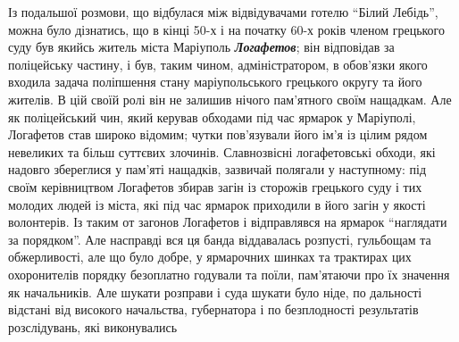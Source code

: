 \documentclass[a4paper,20pt]{report}
\begin{document}
Із подальшої розмови, що відбулася між відвідувачами готелю ``Білий Лебідь'', можна було
дізнатись, що в кінці 50-х і на початку 60-х років членом грецького суду був якийсь
житель міста Маріуполь \textbf{\em Логафетов}; він відповідав за поліцейську частину, і був,
таким чином, адміністратором, в обов'язки якого входила задача поліпшення стану маріупольського
грецького округу та його жителів.
В цій своїй ролі він не залишив нічого пам'ятного своїм нащадкам. Але як поліцейський чин,
який керував обходами під час ярмарок у Маріуполі, Логафетов став широко відомим; 
чутки пов'язували його ім'я із цілим рядом невеликих та більш суттєвих злочинів.
Славнозвісні логафетовські обходи, які надовго збереглися у пам'яті нащадків, зазвичай полягали
у наступному: під своїм керівництвом Логафетов збирав загін із сторожів грецького суду і тих молодих
людей із міста, які під час ярмарок приходили в його загін у якості волонтерів. Із таким от загонов 
Логафетов і відправлявся на ярмарок ``наглядати за порядком''. Але насправді вся ця банда віддавалась
розпусті, гульбощам та обжерливості, але що було добре, у ярмарочних шинках та трактирах цих охоронителів
порядку безоплатно годували та поїли, пам'ятаючи про
їх значення як начальників. Але шукати розправи і суда шукати було ніде, по дальності відстані
від високого начальства, губернатора і по безплодності результатів розслідувань, які виконувались
\end{document}
